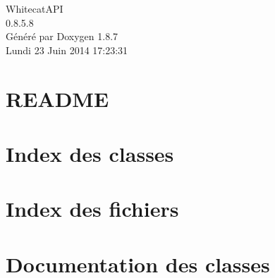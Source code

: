 \documentclass[twoside]{book}
\newcommand{\+}{\discretionary{\mbox{\scriptsize$\hookleftarrow$}}{}{}}
\newcommand{\clearemptydoublepage}{%
  \newpage{\pagestyle{empty}\cleardoublepage}%
}
\begin{document}
\hypersetup{pageanchor=false,
             bookmarks=true,
             bookmarksnumbered=true,
             pdfencoding=unicode
            }
\begin{titlepage}
\vspace*{7cm}
\begin{center}%
{\Large Whitecat\+A\+P\+I \\[1ex]\large 0.\+8.\+5.\+8 }\\
\vspace*{1cm}
{\large Généré par Doxygen 1.8.7}\\
\vspace*{0.5cm}
{\small Lundi 23 Juin 2014 17:23:31}\\
\end{center}
\end{titlepage}
\clearemptydoublepage
\tableofcontents
\clearemptydoublepage
{}
\hypersetup{pageanchor=true}

\chapter{R\+E\+A\+D\+M\+E}
\label{md__r_e_a_d_m_e}
\hypertarget{md__r_e_a_d_m_e}{}

\chapter{Index des classes}

\chapter{Index des fichiers}

\chapter{Documentation des classes}






\end{document}
